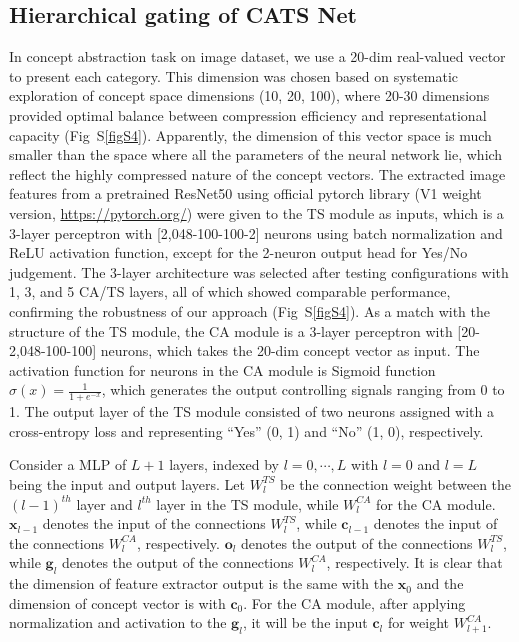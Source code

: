 \documentclass[pdflatex,sn-mathphys-num,lineno]{sn-jnl}%
\begin{document}
\begin{CJK}{UTF8}{gbsn}
\subsection{Hierarchical gating of CATS Net}
In concept abstraction task on image dataset, we use a 20-dim real-valued vector to present each category. This dimension was chosen based on systematic exploration of concept space dimensions (10, 20, 100), where 20-30 dimensions provided optimal balance between compression efficiency and representational capacity (Fig~S\ref{figS4}). Apparently, the dimension of this vector space is much smaller than the space where all the parameters of the neural network lie, which reflect the highly compressed nature of the concept vectors. The extracted image features from a pretrained ResNet50 \cite{he_deep_2016} using official pytorch library (V1 weight version, \url{https://pytorch.org/}) were given to the TS module as inputs, which is a 3-layer perceptron with [2,048-100-100-2] neurons using batch normalization and ReLU activation function, except for the 2-neuron output head for Yes/No judgement. The 3-layer architecture was selected after testing configurations with 1, 3, and 5 CA/TS layers, all of which showed comparable performance, confirming the robustness of our approach (Fig~S\ref{figS4}). As a match with the structure of the TS module, the CA module is a 3-layer perceptron with [20-2,048-100-100] neurons, which takes the 20-dim concept vector as input. The activation function for neurons in the CA module is Sigmoid function $\sigma(x) = \frac{1}{1 + e^{-x}}$, which generates the output controlling signals ranging from 0 to 1. The output layer of the TS module consisted of two neurons assigned with a cross-entropy loss and representing “Yes” (0, 1) and “No” (1, 0), respectively.

Consider a MLP of $L+1$ layers, indexed by $l=0,\cdots,L$ with $l = 0$ and $l = L$ being the input and output layers. Let $W_l^{TS}$ be the connection weight between the $(l-1)^{th}$ layer and $l^{th}$ layer in the TS module, while $W_l^{CA}$ for the CA module. $\mathbf{x}_{l-1}$ denotes the input of the connections $W_l^{TS}$, while $\mathbf{c}_{l-1}$ denotes the input of the connections $W_l^{CA}$, respectively. $\mathbf{o}_{l}$ denotes the output of the connections $W_l^{TS}$, while $\mathbf{g}_{l}$ denotes the output of the connections $W_l^{CA}$, respectively. It is clear that the dimension of feature extractor output is the same with the $\mathbf{x}_{0}$ and the dimension of concept vector is with $\mathbf{c}_{0}$. For the CA module, after applying normalization and activation to the $\mathbf{g}_{l}$, it will be the input $\mathbf{c}_{l}$ for weight $W_{l+1}^{CA}$.


\end{CJK}
\end{document}
